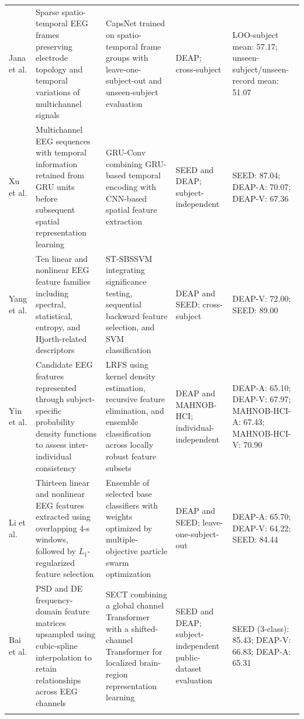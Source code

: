 \documentclass{WileyMSP-template}
\newcommand{\lightrowsep}{%
    \arrayrulecolor{lightrowgray}%
    \specialrule{0.30pt}{3.5pt}{3.5pt}%
    \arrayrulecolor{black}%
}
\begin{document}
\begin{table}
\begin{tabularx}{\textheight}{
>{\raggedright\arraybackslash}p{3.15cm}
>{\raggedright\arraybackslash}X
>{\raggedright\arraybackslash}X
>{\raggedright\arraybackslash}p{3.45cm}
>{\raggedright\arraybackslash}p{5.0cm}}
Jana et al. \cite{jana2022capsnet} &
Sparse spatio-temporal EEG frames preserving electrode topology
and temporal variations of multichannel signals &
CapsNet trained on spatio-temporal frame groups with leave-one-subject-out
and unseen-subject evaluation &
DEAP; cross-subject &
LOO-subject mean: 57.17;
unseen-subject/unseen-record mean: 51.07 \\
\lightrowsep

Xu et al. \cite{xu2023gruconv} &
Multichannel EEG sequences with temporal information retained from GRU units
before subsequent spatial representation learning &
GRU-Conv combining GRU-based temporal encoding with
CNN-based spatial feature extraction &
SEED and DEAP; subject-independent &
SEED: 87.04;
DEAP-A: 70.07;
DEAP-V: 67.36 \\
\lightrowsep

Yang et al. \cite{yang2019stsbssvm} &
Ten linear and nonlinear EEG feature families including spectral,
statistical, entropy, and Hjorth-related descriptors &
ST-SBSSVM integrating significance testing, sequential backward
feature selection, and SVM classification &
DEAP and SEED; cross-subject &
DEAP-V: 72.00;
SEED: 89.00 \\
\lightrowsep

Yin et al. \cite{yin2020lrfs} &
Candidate EEG features represented through subject-specific probability
density functions to assess inter-individual consistency &
LRFS using kernel density estimation, recursive feature elimination,
and ensemble classification across locally robust feature subsets &
DEAP and MAHNOB-HCI; individual-independent &
DEAP-A: 65.10;
DEAP-V: 67.97;
MAHNOB-HCI-A: 67.43;
MAHNOB-HCI-V: 70.90 \\
\lightrowsep

Li et al. \cite{li2022mopso} &
Thirteen linear and nonlinear EEG features extracted using overlapping
4-s windows, followed by $L_1$-regularized feature selection &
Ensemble of selected base classifiers with weights optimized by
multiple-objective particle swarm optimization &
DEAP and SEED; leave-one-subject-out &
DEAP-A: 65.70;
DEAP-V: 64.22;
SEED: 84.44 \\
\lightrowsep

Bai et al. \cite{bai2023sect} &
PSD and DE frequency-domain feature matrices upsampled using cubic-spline
interpolation to retain relationships across EEG channels &
SECT combining a global channel Transformer with a shifted-channel
Transformer for localized brain-region representation learning &
SEED and DEAP; subject-independent public-dataset evaluation &
SEED (3-class): 85.43;
DEAP-V: 66.83;
DEAP-A: 65.31 \\
\lightrowsep


\end{tabularx}
\end{table}
\end{document}
